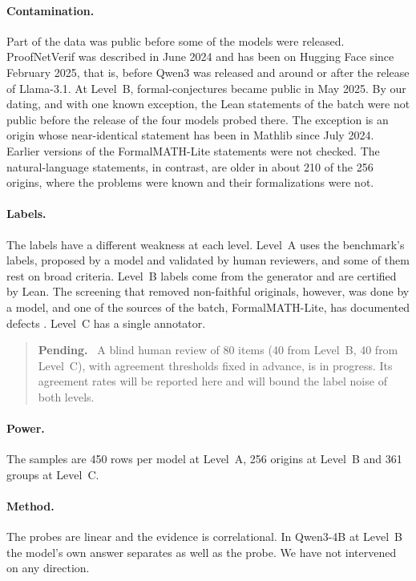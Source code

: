 \documentclass[10pt]{article}
\newenvironment{pendiente}{\begin{quote}\small\noindent\textbf{Pending.}\ }{\end{quote}}
\begin{document}
\paragraph{Contamination.}
Part of the data was public before some of the models were released. ProofNetVerif was described in June 2024 and has been on Hugging Face
since February 2025, that is, before Qwen3 was released and around or after the release of Llama-3.1. At Level~B,
formal-conjectures became public in May 2025. By our dating, and with one known exception, the Lean statements of
the batch were not public before the release of the four models probed there. The exception is an origin whose
near-identical statement has been in Mathlib since July 2024. Earlier versions of the FormalMATH-Lite statements
were not checked. The natural-language statements, in contrast, are older in about 210 of the 256 origins, where
the problems were known and their formalizations were not.

\paragraph{Labels.}
The labels have a different weakness at each level. Level~A uses the benchmark's labels, proposed by a model and
validated by human reviewers, and some of them rest on broad criteria. Level~B labels come from the generator and
are certified by Lean. The screening that removed non-faithful originals, however, was done by a model, and one of
the sources of the batch, FormalMATH-Lite, has documented defects \citep{ammanamanchi2026faults}.
Level~C has a single annotator.

\begin{pendiente}
A blind human review of 80 items (40 from Level~B, 40 from Level~C), with agreement thresholds fixed in advance, is
in progress. Its agreement rates will be reported here and will bound the label noise of both levels.
\end{pendiente}

\paragraph{Power.}
The samples are 450 rows per model at Level~A, 256 origins at Level~B and 361 groups at Level~C.

\paragraph{Method.}
The probes are linear and the evidence is correlational. In Qwen3-4B at Level~B the model's own answer separates as
well as the probe. We have not intervened on any direction.
\end{document}
